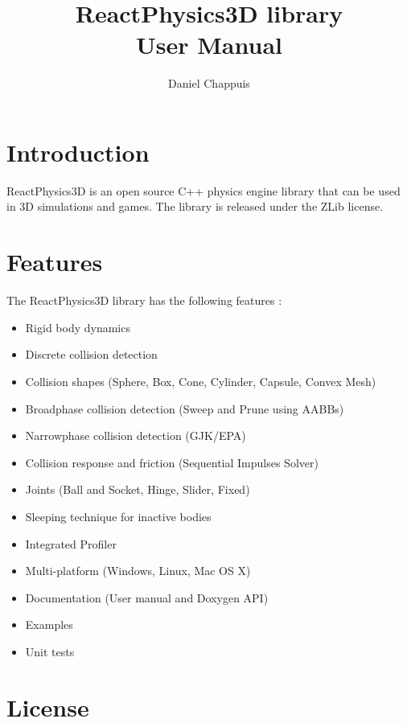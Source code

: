 \documentclass[a4paper,12pt]{article}
\begin{document}
   \author{Daniel Chappuis}
   \title{ReactPhysics3D library \\ User Manual}
   \maketitle

   \tableofcontents

   \newpage
 

   \section{Introduction}

  ReactPhysics3D is an open source C++ physics engine library that can be used
  in 3D simulations and games. The library is released under the ZLib license.

   \section{Features}

   The ReactPhysics3D library has the following features :

   \begin{itemize}
    \item Rigid body dynamics 
    \item Discrete collision detection 
    \item Collision shapes (Sphere, Box, Cone, Cylinder, Capsule, Convex Mesh) 
    \item Broadphase collision detection (Sweep and Prune using AABBs) 
    \item Narrowphase collision detection (GJK/EPA) 
    \item Collision response and friction (Sequential Impulses Solver)
    \item Joints (Ball and Socket, Hinge, Slider, Fixed)
    \item Sleeping technique for inactive bodies
    \item Integrated Profiler 
    \item Multi-platform (Windows, Linux, Mac OS X)
    \item Documentation (User manual and Doxygen API)
    \item Examples
    \item Unit tests
   \end{itemize}

    \section{License}
\end{document}
